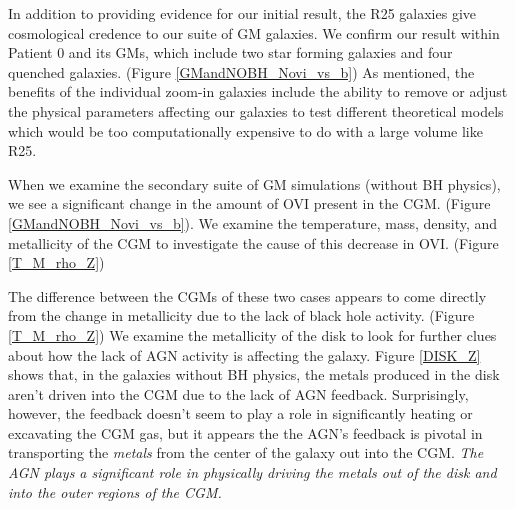 \documentclass[]{emulateapj}
\begin{document}
In addition to providing evidence for our initial result, the R25 galaxies give cosmological credence to our suite of GM galaxies. We confirm our result within Patient 0 and its GMs, which include two star forming galaxies and four quenched galaxies. (Figure \ref{GMandNOBH_Novi_vs_b}) As mentioned, the benefits of the individual zoom-in galaxies include the ability to remove or adjust the physical parameters affecting our galaxies to test different theoretical models which would be too computationally expensive to do with a large volume like R25.


When we examine the secondary suite of GM simulations (without BH physics), we see a significant change in the amount of OVI present in the CGM. (Figure \ref{GMandNOBH_Novi_vs_b}). We examine the temperature, mass, density, and metallicity of the CGM to investigate the cause of this decrease in OVI. (Figure \ref{T_M_rho_Z})


The difference between the CGMs of these two cases appears to come directly from the change in metallicity due to the lack of black hole activity. (Figure \ref{T_M_rho_Z}) We examine the metallicity of the disk to look for further clues about how the lack of AGN activity is affecting the galaxy. Figure \ref{DISK_Z} shows that, in the galaxies without BH physics, the metals produced in the disk aren't driven into the CGM due to the lack of AGN feedback. Surprisingly, however, the feedback doesn't seem to play a role in significantly heating or excavating the CGM gas, but it appears the the AGN's feedback is pivotal in transporting the \textit{metals} from the center of the galaxy out into the CGM. \textit{The AGN plays a significant role in physically driving the metals out of the disk and into the outer regions of the CGM.}


\end{document}
